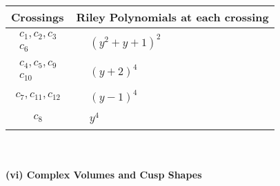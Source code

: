\documentclass[1p]{elsarticle_modified}
\theoremstyle{definition}
\begin{document}
\begin{tabular}{m{50pt}|m{274pt}}
Crossings & \hspace{64pt}Riley Polynomials at each crossing \\
\hline $$\begin{aligned}c_{1},c_{2},c_{3}\\c_{6}\end{aligned}$$&$\begin{aligned}
&(y^2+y+1)^2
\end{aligned}$\\
\hline $$\begin{aligned}c_{4},c_{5},c_{9}\\c_{10}\end{aligned}$$&$\begin{aligned}
&(y+2)^4
\end{aligned}$\\
\hline $$\begin{aligned}c_{7},c_{11},c_{12}\end{aligned}$$&$\begin{aligned}
&(y-1)^4
\end{aligned}$\\
\hline $$\begin{aligned}c_{8}\end{aligned}$$&$\begin{aligned}
&y^4
\end{aligned}$\\
\hline
\end{tabular}\\~\\
\newpage\flushleft \textbf{(vi) Complex Volumes and Cusp Shapes}
\end{document}
